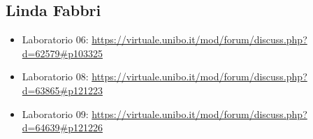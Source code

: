 \documentclass[a4paper,12pt]{report}
\begin{document}
\subsection{Linda Fabbri}

\begin{itemize}
	\item Laboratorio 06:
	\url{https://virtuale.unibo.it/mod/forum/discuss.php?d=62579#p103325}
	\item Laboratorio 08: \url{https://virtuale.unibo.it/mod/forum/discuss.php?d=63865#p121223}
	\item Laboratorio 09: \url{https://virtuale.unibo.it/mod/forum/discuss.php?d=64639#p121226}
\end{itemize}


\end{document}
